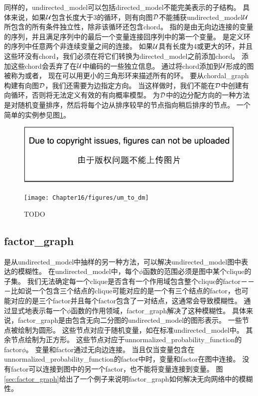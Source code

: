 同样的，\gls{undirected_model}可以包括\gls{directed_model}不能完美表示的子结构。
具体来说，如果$\mathcal{U}$包含长度大于3的循环，则有向图$\mathcal{D}$不能捕获\gls{undirected_model}$\mathcal{U}$所包含的所有条件独立性，除非该循环还包含\gls{chord}。
指的是由无向边连接的变量的序列，并且满足序列中的最后一个变量连接回序列中的第一个变量。
是定义环的序列中任意两个非连续变量之间的连接。
如果$\mathcal{U}$具有长度为4或更大的环，并且这些环没有\gls{chord}，我们必须在将它们转换为\gls{directed_model}之前添加\gls{chord}。
添加这些\gls{chord}会丢弃了在$\mathcal{U}$中编码的一些独立信息。
通过将\gls{chord}添加到$\mathcal{U}$形成的图被称为或者，
现在可以用更小的三角形环来描述所有的环。
要从\gls{chordal_graph}构建有向图$\mathcal{D}$，我们还需要为边指定方向。
当这样做时，我们不能在$\mathcal{D}$中创建有向循环，否则将无法定义有效的有向概率模型。
为$\mathcal{D}$中的边分配方向的一种方法是对随机变量排序，然后将每个边从排序较早的节点指向稍后排序的节点。
一个简单的实例参见图\ref{fig:um_to_dm}。


\begin{figure}[!htb]
\ifOpenSource
\centerline{\includegraphics{figure.pdf}}
\else
	\centerline{\texttt{[image: Chapter16/figures/um\_to\_dm]}}	
\fi
	\caption{TODO}
	\label{fig:um_to_dm}
\end{figure}



\subsection{\gls{factor_graph}}
\label{sec:factor_graphs}



是从\gls{undirected_model}中抽样的另一种方法，可以解决\gls{undirected_model}图中表达的模糊性。
在\gls{undirected_model}中，每个$\phi$函数的范围必须是图中某个\gls{clique}的子集。
我们无法确定每一个\gls{clique}是否含有一个作用域包含整个\gls{clique}的\gls{factor}－－－比如说一个包含三个结点的\gls{clique}可能对应的是一个有三个结点的\gls{factor}，也可能对应的是三个\gls{factor}并且每个\gls{factor}包含了一对结点，这通常会导致模糊性。
通过显式地表示每一个$\phi$函数的作用领域，\gls{factor_graph}解决了这种模糊性。
具体来说，\gls{factor_graph}是由包含无向二分图的\gls{undirected_model}的图形表示。
一些节点被绘制为圆形。 
这些节点对应于随机变量，如在标准\gls{undirected_model}中。
其余节点绘制为正方形。
这些节点对应于\gls{unnormalized_probability_function}的\gls{factor}$\phi$。
变量和\gls{factor}通过无向边连接。
当且仅当变量包含在\gls{unnormalized_probability_function}的\gls{factor}中时，变量和\gls{factor}在图中连接。
没有\gls{factor}可以连接到图中的另一个\gls{factor}，也不能将变量连接到变量。
图\ref{sec:factor_graph}给出了一个例子来说明\gls{factor_graph}如何解决无向网络中的模糊性。


